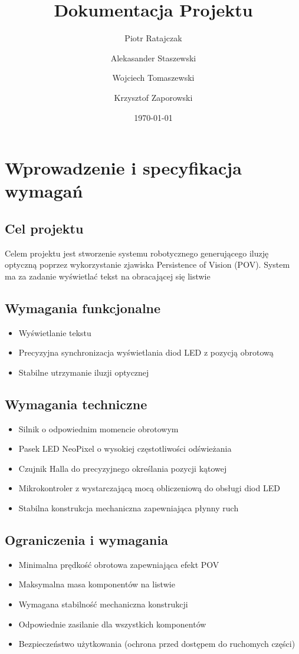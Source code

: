 \documentclass{article}
\title{Dokumentacja Projektu}
\author{Piotr Ratajczak \and Alekasander Staszewski \and Wojciech Tomaszewski \and Krzysztof Zaporowski}
\date{\today}
\begin{document}
\maketitle

\section{Wprowadzenie i specyfikacja wymagań}
\subsection{Cel projektu}
Celem projektu jest stworzenie systemu robotycznego generującego iluzję optyczną poprzez wykorzystanie zjawiska 
Persistence of Vision (POV). System ma za zadanie wyświetlać tekst na obracającej się listwie

\subsection{Wymagania funkcjonalne}
\begin{itemize}
    \item Wyświetlanie tekstu 
    \item Precyzyjna synchronizacja wyświetlania diod LED z pozycją obrotową
    \item Stabilne utrzymanie iluzji optycznej
\end{itemize}

\subsection{Wymagania techniczne}
\begin{itemize}
    \item Silnik o odpowiednim momencie obrotowym
    \item Pasek LED NeoPixel o wysokiej częstotliwości odświeżania
    \item Czujnik Halla do precyzyjnego określania pozycji kątowej
    \item Mikrokontroler z wystarczającą mocą obliczeniową do obsługi diod LED
    \item Stabilna konstrukcja mechaniczna zapewniająca płynny ruch
\end{itemize}

\subsection{Ograniczenia i wymagania}
\begin{itemize}
    \item Minimalna prędkość obrotowa zapewniająca efekt POV
    \item Maksymalna masa komponentów na listwie
    \item Wymagana stabilność mechaniczna konstrukcji
    \item Odpowiednie zasilanie dla wszystkich komponentów
    \item Bezpieczeństwo użytkowania (ochrona przed dostępem do ruchomych części)
\end{itemize}
\end{document}
